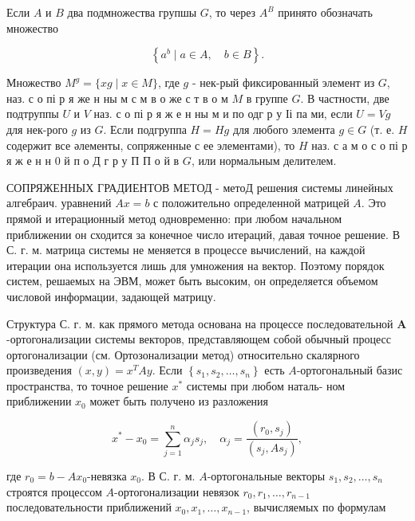 \documentclass[10pt]{article}
\begin{document}
Если $A$ и $B$ два подмножества групшы $G$, то через $A^{B}$ принято обозначать множество



\[

\left\{a^{b} \mid a \in A, \quad b \in B\right\} .

\]



Множество $M^{g}=\{x g \mid x \in M\}$, где $g$ - нек-рый фиксированный элемент из $G$, наз. с о пі р я же н ны м с м в о же с т в о м $M$ в группе $G$. В частности, две подтруппы $U$ и $V$ наз. с о пі р я ж е н ны м и по одг р у Іі па ми, если $U=V g$ для нек-рого $g$ из $G$. Если подгруппа $H=H g$ для любого элемента $g \in G$ (т. е. $H$ содержит все әлементы, сопряженные с ее элементами), то $H$ наз. с а м о с о пі р я ж $е$ н н 0 й п $о$ Д г р у П П о й в $G$, или нормальным делителем.



СОПРЯЖЕННЫХ ГРАДИЕНТОВ МЕТОД - метоД решения системы линейных алгебраич. уравнений $A x=b$ с положительно определенной матрицей $A$. Это прямой и итерационный метод одновременно: при любом начальном приближении он сходится за конечное число итераций, давая точное решение. В С. г. м. матрица системы не меняется в процессе вычислений, на каждой итерации она используется лишь для умножения на вектор. Поэтому порядок систем, решаемых на ЭВМ, может быть высоким, он определяется объемом числовой информации, задающей матрицу.



Структура С. г. м. как прямого метода основана на процессе последовательной $\boldsymbol{A}$-ортогонализации системы векторов, представляющем собой обычный процесс ортогонализации (см. Ортозонализации метод) относительно скалярного произведения $(x, y)=x^{T} A y$. Если $\left\{s_{1}, s_{2}, \ldots, s_{n}\right\}$ есть $A$-ортогональный базис пространства, то точное решение $x^{*}$ системы при любом наталь- ном приближении $x_{0}$ может быть получено из разложения



\[

x^{*}-x_{0}=\sum_{j=1}^{n} \alpha_{j} s_{j}, \quad \alpha_{j}=\frac{\left(r_{0}, s_{j}\right)}{\left(s_{j}, A s_{j}\right)},

\]



где $r_{0}=b-A x_{0}$-невязка $x_{0}$. В С. г. м. $A$-ортогональные векторы $s_{1}, s_{2}, \ldots, s_{n}$ строятся процессом $A$-ортогонализации невязок $r_{0}, r_{1}, \ldots, r_{n-1}$ последовательности приближений $x_{0}, x_{1}, \ldots, x_{n-1}$, вычисляемых по формулам
\end{document}
